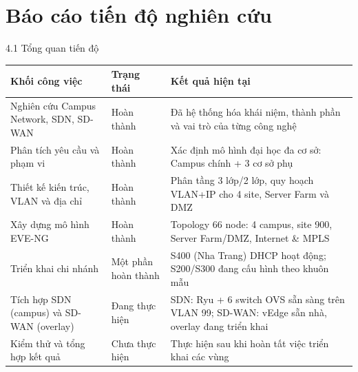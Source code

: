 
\section{Báo cáo tiến độ nghiên cứu}

\begin{frame}{4.1 Tổng quan tiến độ}
    \begin{table}
        \centering
        \scriptsize
        \setlength{\tabcolsep}{4pt}
        \renewcommand{\arraystretch}{1.28}
        \begin{tabular}{|p{}|p{}|p{}|}
            \hline
            \rowcolor{primaryDark!15}
            \textbf{Khối công việc} & \textbf{Trạng thái} & \textbf{Kết quả hiện tại} \\
            \hline
            Nghiên cứu Campus Network, SDN, SD-WAN & Hoàn thành & Đã hệ thống hóa khái niệm, thành phần và vai trò của từng công nghệ \\
            \hline
            Phân tích yêu cầu và phạm vi & Hoàn thành & Xác định mô hình đại học đa cơ sở: Campus chính + 3 cơ sở phụ \\
            \hline
            Thiết kế kiến trúc, VLAN và địa chỉ & Hoàn thành & Phân tầng 3 lớp/2 lớp, quy hoạch VLAN+IP cho 4 site, Server Farm và DMZ \\
            \hline
            Xây dựng mô hình EVE-NG & Hoàn thành & Topology 66 node: 4 campus, site 900, Server Farm/DMZ, Internet \& MPLS \\
            \hline
            Triển khai chi nhánh & Một phần hoàn thành & S400 (Nha Trang) DHCP hoạt động; S200/S300 đang cấu hình theo khuôn mẫu \\
            \hline
            Tích hợp SDN (campus) và SD-WAN (overlay) & Đang thực hiện & SDN: Ryu + 6 switch OVS sẵn sàng trên VLAN 99; SD-WAN: vEdge sẵn nhà, overlay đang triển khai \\
            \hline
            Kiểm thử và tổng hợp kết quả & Chưa thực hiện & Thực hiện sau khi hoàn tất việc triển khai các vùng \\
            \hline
        \end{tabular}
    \end{table}
\end{frame}

